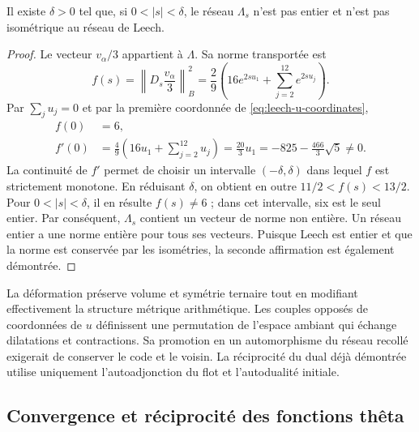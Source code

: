 \begin{proposition}
\label{prop:leech-nonintegral}
Il existe \(\delta>0\) tel que, si \(0<|s|<\delta\), le réseau \(\Lambda_s\) n'est pas entier et n'est pas isométrique au réseau de Leech.
\end{proposition}
\begin{proof}
Le vecteur \(v_\alpha/3\) appartient à \(\Lambda\). Sa norme
transportée est
\begin{equation}
 f(s)=\left\|D_s\frac{v_\alpha}{3}\right\|_B^2
 =\frac29\left(16e^{2su_1}+
                       \sum_{j=2}^{12}e^{2su_j}\right).
 \label{eq:leech-witness}
\end{equation}
Par \(\sum_j u_j=0\) et par la première coordonnée de
\eqref{eq:leech-u-coordinates},
\begin{equation}
\begin{split}
 f(0)&=6,\\
 f'(0)&=\frac49\left(16u_1+\sum_{j=2}^{12}u_j\right)
       =\frac{20}{3}u_1
       =-825-\frac{466}{3}\sqrt5\ne0.
\end{split}
\label{eq:leech-witness-derivative}
\end{equation}
La continuité de \(f'\) permet de choisir un intervalle \((-\delta,\delta)\) dans lequel \(f\) est strictement monotone. En réduisant \(\delta\), on obtient en outre \(11/2<f(s)<13/2\). Pour \(0<|s|<\delta\), il en résulte \(f(s)\ne6\) ; dans cet intervalle, six est le seul entier. Par conséquent, \(\Lambda_s\) contient un vecteur de norme non entière. Un réseau entier a une norme entière pour tous ses vecteurs. Puisque Leech est entier et que la norme est conservée par les isométries, la seconde affirmation est également démontrée.
\end{proof}

La déformation préserve volume et symétrie ternaire tout en
modifiant effectivement la structure métrique arithmétique. Les couples
opposés de coordonnées de \(u\) définissent une permutation de l’espace
ambiant qui échange dilatations et contractions. Sa promotion
en un automorphisme du réseau recollé exigerait de conserver le code
et le voisin. La réciprocité du dual déjà démontrée utilise
uniquement l’autoadjonction du flot et l’autodualité initiale.

\subsection{Convergence et réciprocité des fonctions thêta}
\label{subsec:leech-theta}

